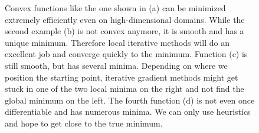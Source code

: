 \begin{figure}
  \centering
  \caption{Convex functions like the one shown in (a) can be minimized extremely
  efficiently even on high-dimensional domains. While the second example (b) is
  not convex anymore, it is smooth and has a unique minimum. Therefore local
  iterative methods will do an excellent job and converge quickly to the
  minimum. Function (c) is still smooth, but has several minima. Depending on
  where we position the starting point, iterative gradient methods might get
  stuck in one of the two local minima on the right and not find the global
  minimum on the left. The fourth function (d) is not even once differentiable
  and has numerous minima. We can only use heuristics and hope to get close to
  the true minimum.}
\label{fig:samplefunc}
\end{figure}

